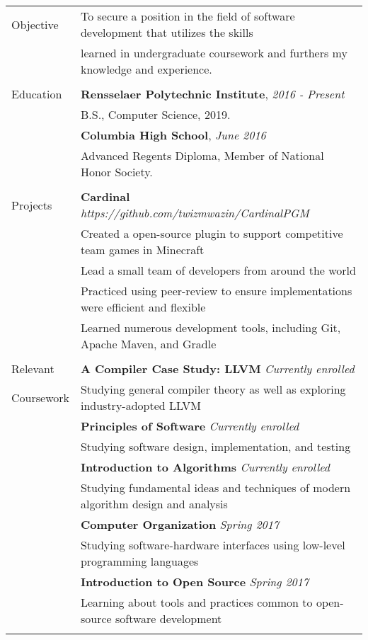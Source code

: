 \documentclass[letterpaper,10pt,oneside]{article}
\begin{document}
\noindent
\begin{tabular}{@{} l l}

  \Large{Objective}
  & To secure a position in the field of software development that utilizes the skills \\
  & learned in undergraduate coursework and furthers my knowledge and experience. \\
  & \\

  \Large{Education}
  & \textbf{Rensselaer Polytechnic Institute}, \textit{2016 - Present} \\
  & B.S., Computer Science, 2019. \\
  & \textbf{Columbia High School}, \textit{June 2016} \\
  & Advanced Regents Diploma, Member of National Honor Society. \\
  & \\

  \Large{Projects}
  & \textbf{Cardinal} \textit{https://github.com/twizmwazin/CardinalPGM} \\
  & Created a open-source plugin to support competitive team games in Minecraft \\
  & Lead a small team of developers from around the world \\
  & Practiced using peer-review to ensure implementations were efficient and flexible \\
  & Learned numerous development tools, including Git, Apache Maven, and Gradle \\
  & \\

  \Large{Relevant}
  & \textbf{A Compiler Case Study: LLVM} \textit{Currently enrolled} \\
  \Large{Coursework}
  & Studying general compiler theory as well as exploring industry-adopted LLVM \\
  & \textbf{Principles of Software} \textit{Currently enrolled} \\
  & Studying software design, implementation, and testing \\
  & \textbf{Introduction to Algorithms} \textit{Currently enrolled} \\
  & Studying fundamental ideas and techniques of modern algorithm design and analysis \\
  & \textbf{Computer Organization} \textit{Spring 2017} \\
  & Studying software-hardware interfaces using low-level programming languages \\
  & \textbf{Introduction to Open Source} \textit{Spring 2017} \\
  & Learning about tools and practices common to open-source software development \\
  & \\


\end{tabular}
\end{document}
